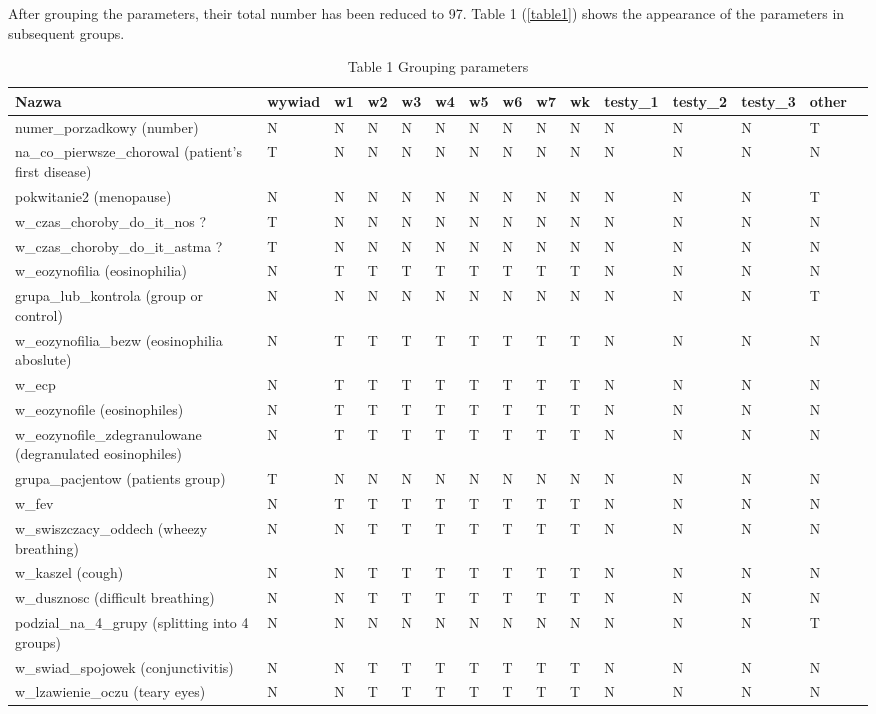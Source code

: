 \documentclass[10pt,oneside]{memoir}
\begin{document}
After grouping the parameters, their total number has been reduced to 97. Table 1 (\autoref{table1}) shows the appearance of the parameters in subsequent groups.


\begin{table}[htbp]
\begin{minipage}{\linewidth}
\setlength{\tymax}{0.5\linewidth}
\centering
\small
\caption{Table 1 Grouping parameters}
\label{table1}
\begin{tabulary}{\linewidth}{@{}l@{}l@{}l@{}l@{}l@{}l@{}l@{}l@{}l@{}l@{}l@{}l@{}l@{}l@{}l@{}} \\ \toprule 
Nazwa&wywiad&w1&w2&w3&w4&w5&w6&w7&wk&testy\_1&testy\_2&testy\_3&other \\\midrule
numer\_porzadkowy (number)&N&N&N&N&N&N&N&N&N&N&N&N&T \\
na\_co\_pierwsze\_chorowal (patient's first disease)&T&N&N&N&N&N&N&N&N&N&N&N&N \\
pokwitanie2 (menopause)&N&N&N&N&N&N&N&N&N&N&N&N&T \\
w\_czas\_choroby\_do\_it\_nos ?&T&N&N&N&N&N&N&N&N&N&N&N&N \\
w\_czas\_choroby\_do\_it\_astma ?&T&N&N&N&N&N&N&N&N&N&N&N&N \\
w\_eozynofilia (eosinophilia)&N&T&T&T&T&T&T&T&T&N&N&N&N \\
grupa\_lub\_kontrola (group or control)&N&N&N&N&N&N&N&N&N&N&N&N&T \\
w\_eozynofilia\_bezw (eosinophilia aboslute)&N&T&T&T&T&T&T&T&T&N&N&N&N \\
w\_ecp&N&T&T&T&T&T&T&T&T&N&N&N&N \\
w\_eozynofile (eosinophiles)&N&T&T&T&T&T&T&T&T&N&N&N&N \\
w\_eozynofile\_zdegranulowane (degranulated eosinophiles)&N&T&T&T&T&T&T&T&T&N&N&N&N \\
grupa\_pacjentow (patients group)&T&N&N&N&N&N&N&N&N&N&N&N&N \\
w\_fev&N&T&T&T&T&T&T&T&T&N&N&N&N \\
w\_swiszczacy\_oddech (wheezy breathing)&N&N&T&T&T&T&T&T&T&N&N&N&N \\
w\_kaszel (cough)&N&N&T&T&T&T&T&T&T&N&N&N&N \\
w\_dusznosc (difficult breathing)&N&N&T&T&T&T&T&T&T&N&N&N&N \\
podzial\_na\_4\_grupy (splitting into 4 groups)&N&N&N&N&N&N&N&N&N&N&N&N&T \\
w\_swiad\_spojowek (conjunctivitis)&N&N&T&T&T&T&T&T&T&N&N&N&N \\
w\_lzawienie\_oczu (teary eyes)&N&N&T&T&T&T&T&T&T&N&N&N&N \\

\end{tabulary}
\end{minipage}
\end{table}
\end{document}
